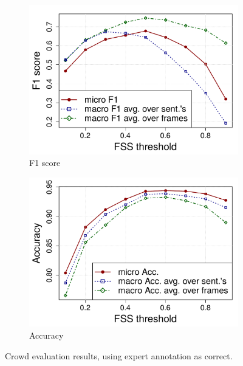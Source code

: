 \begin{figure}[tbh!]
\centering
\begin{subfigure}{.5\textwidth}
\centering
\includegraphics[width=\linewidth]{img/sent_f1_micro_macro.pdf}
\caption{F1 score}
\label{fig:sent_f1}
\end{subfigure}%
\begin{subfigure}{.5\textwidth}
\centering
\includegraphics[width=\linewidth]{img/sent_acc_micro_macro.pdf}
\caption{Accuracy}
\label{fig:sent_acc}
\end{subfigure}
\caption{Crowd evaluation results, using expert annotation as correct.}
\end{figure}

